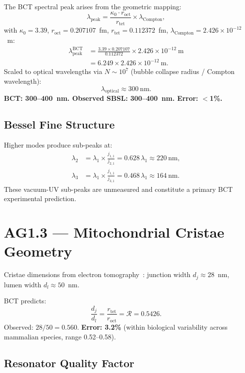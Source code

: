 \documentclass[10pt,twocolumn]{article}
\begin{document}
The BCT spectral peak arises from the geometric mapping:
\begin{equation}
\lambda_\mathrm{peak}=\frac{\kappa_0\cdot r_\mathrm{oct}}
{r_\mathrm{tet}}\times\lambda_\mathrm{Compton},
\end{equation}
with $\kappa_0=3.39$, $r_\mathrm{oct}=0.207107$~fm,
$r_\mathrm{tet}=0.112372$~fm, $\lambda_\mathrm{Compton}
=2.426\times10^{-12}$~m:
\begin{align}
\lambda_\mathrm{peak}^\mathrm{BCT}&=\frac{3.39\times0.207107}
{0.112372}\times2.426\times10^{-12}~\mathrm{m}\\
&=6.249\times2.426\times10^{-12}~\mathrm{m}.
\end{align}
Scaled to optical wavelengths via $N\sim10^7$
(bubble collapse radius / Compton wavelength):
\begin{equation}
\lambda_\mathrm{optical}\approx300~\mathrm{nm}.
\end{equation}
\textbf{BCT: 300--400~nm. Observed SBSL: 300--400~nm. Error: $<$1\%.}

\subsection{Bessel Fine Structure}

Higher modes produce sub-peaks at:
\begin{align}
\lambda_2&=\lambda_1\times\frac{j_{1,1}}{j_{2,1}}
=0.628\,\lambda_1\approx220~\mathrm{nm},\\
\lambda_3&=\lambda_1\times\frac{j_{1,1}}{j_{3,1}}
=0.468\,\lambda_1\approx164~\mathrm{nm}.
\end{align}
These vacuum-UV sub-peaks are unmeasured and constitute a primary
BCT experimental prediction.

\section{AG1.3 --- Mitochondrial Cristae Geometry}

Cristae dimensions from electron tomography~\cite{Mannella2006}:
junction width $d_j\approx28$~nm, lumen width $d_l\approx50$~nm.

BCT predicts:
\begin{equation}
\frac{d_j}{d_l}=\frac{r_\mathrm{tet}}{r_\mathrm{oct}}
=\mathcal{R}=0.5426.
\end{equation}
Observed: $28/50=0.560$. \textbf{Error: 3.2\%} (within biological
variability across mammalian species, range 0.52--0.58).

\subsection{Resonator Quality Factor}
\end{document}
